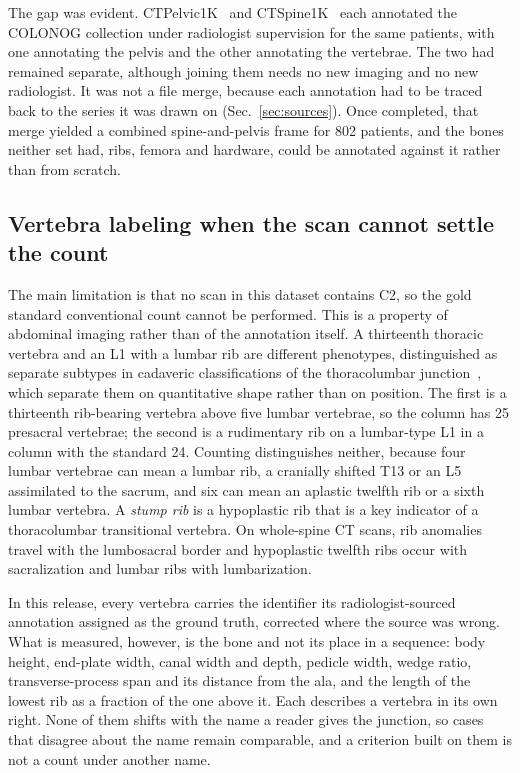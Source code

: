 \documentclass[aapm,mph,amsmath,amssymb,preprint,linenumbers]{revtex4-2}
\begin{document}
The gap was evident. CTPelvic1K~\cite{ctpelvic1k} and CTSpine1K~\cite{ctspine1k} each annotated the COLONOG
collection under radiologist supervision for the same patients, with one annotating the pelvis and the other annotating the vertebrae. The two had remained separate, although joining them needs no new imaging and no new radiologist. It was not a file merge, because each annotation had to be traced back to the series it was
drawn on (Sec.~\ref{sec:sources}). Once completed, that merge yielded a combined spine-and-pelvis frame
for 802 patients, and the bones neither set had, ribs, femora and hardware, could be
annotated against it rather than from scratch.



\subsection{Vertebra labeling when the scan cannot settle the count}

The main limitation is that no scan in this dataset contains C2, so the gold standard
conventional count cannot be performed. This is a property of abdominal imaging rather than of the
annotation itself. A thirteenth thoracic vertebra and an L1 with a lumbar rib are different phenotypes,
distinguished as separate subtypes in cadaveric classifications of the thoracolumbar
junction~\cite{duplessis2018,poolman2023}, which separate them on quantitative shape rather
than on position. The first is a thirteenth rib-bearing vertebra above five lumbar vertebrae,
so the column has 25 presacral vertebrae; the second is a rudimentary rib on a lumbar-type L1
in a column with the standard 24. Counting distinguishes neither, because four lumbar vertebrae
can mean a lumbar rib, a cranially shifted T13 or an L5 assimilated to the sacrum, and six can
mean an aplastic twelfth rib or a sixth lumbar vertebra. A \emph{stump rib} is a hypoplastic rib that is a key indicator of a
thoracolumbar transitional vertebra. On whole-spine CT scans, rib anomalies travel with the lumbosacral border and hypoplastic
twelfth ribs occur with sacralization and lumbar ribs with lumbarization.~\cite{nagata2025}

In this release, every vertebra carries the identifier its radiologist-sourced annotation
assigned as the ground truth, corrected where the source was wrong. What is measured, however,
is the bone and not its place in a sequence: body height, end-plate width, canal width and
depth, pedicle width, wedge ratio, transverse-process span and its distance from the ala, and
the length of the lowest rib as a fraction of the one above it. Each describes a vertebra in
its own right. None of them shifts with the name a reader gives the junction, so cases that
disagree about the name remain comparable, and a criterion built on them is not a count under
another name.
\end{document}

